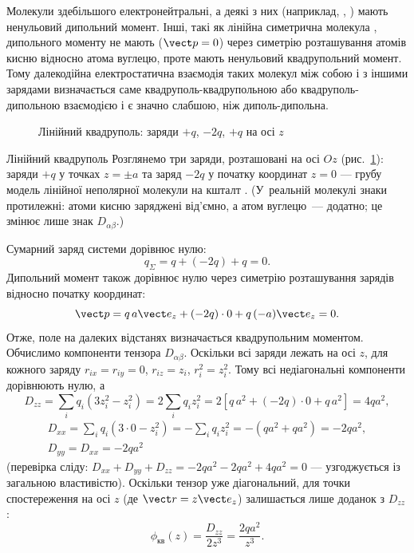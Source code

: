 Молекули здебільшого електронейтральні, а деякі з них (наприклад, , ) мають ненульовий дипольний момент. Інші,
такі як лінійна симетрична молекула , дипольного моменту не мають ($\vect p = 0$) через симетрію розташування атомів кисню відносно атома
вуглецю, проте мають ненульовий квадрупольний момент. Тому далекодійна електростатична взаємодія таких молекул між собою і з іншими зарядами визначається
саме квадруполь-квадрупольною або квадруполь-дипольною взаємодією і є значно слабшою, ніж диполь-дипольна.

\begin{figure}
	\centering
	\caption{Лінійний квадруполь: заряди $+q$, $-2q$, $+q$ на осі $z$}
	\label{tikz:linear_quadrupole}
\end{figure}

\begin{Example}{Лінійний квадруполь}
	Розглянемо три заряди, розташовані на осі $Oz$ (рис.~\ref{tikz:linear_quadrupole}): заряди $+q$ у точках $z=\pm a$ та заряд $-2q$ у початку координат $z=0$ --- грубу модель лінійної
	неполярної молекули на кшталт . (У~реальній молекулі  знаки протилежні: атоми кисню заряджені від'ємно, а атом
	вуглецю~--- додатно; це змінює лише знак $D_{\alpha\beta}$.)

	Сумарний заряд системи дорівнює нулю:
	\begin{equation*}
		q_\Sigma = q + (-2q) + q = 0.
	\end{equation*}
	Дипольний момент також дорівнює нулю через симетрію розташування зарядів відносно початку координат:
	\begin{equation*}
		\vect p = q\,a\vect e_z + (-2q)\cdot 0 + q\,(-a)\vect e_z = 0.
	\end{equation*}
	Отже, поле на далеких відстанях визначається квадрупольним моментом. Обчислимо компоненти тензора $D_{\alpha\beta}$. Оскільки всі заряди лежать на осі
	$z$, для кожного заряду $r_{ix}=r_{iy}=0$, $r_{iz}=z_i$, $r_i^2=z_i^2$. Тому всі недіагональні компоненти дорівнюють нулю, а
	\begin{equation*}
		D_{zz} = \sum_i q_i\left(3z_i^2 - z_i^2\right) = 2\sum_i q_i z_i^2
		= 2\left[q\,a^2 + (-2q)\cdot 0 + q\,a^2\right] = 4qa^2,
	\end{equation*}
	\begin{multline*}
		D_{xx} = \sum_i q_i\left(3\cdot0 - z_i^2\right) = -\sum_i q_i z_i^2 = -\left(qa^2 + qa^2\right) = -2qa^2, \\ D_{yy}=D_{xx}=-2qa^2
	\end{multline*}
	(перевірка сліду: $D_{xx}+D_{yy}+D_{zz} = -2qa^2-2qa^2+4qa^2=0$ --- узгоджується із загальною властивістю). Оскільки тензор уже діагональний, для точки
	спостереження на осі $z$ (де $\vect r = z\vect e_z$) залишається лише доданок з $D_{zz}$:
	\begin{equation*}
		\phi_{\text{кв}}(z) = \frac{D_{zz}}{2z^3} = \frac{2qa^2}{z^3}.
	\end{equation*}
\end{Example}


